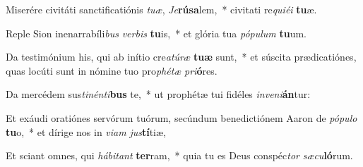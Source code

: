 \item Miserére civitáti sanctificatiónis \textit{tu}\textit{æ}, \textit{Je}\textbf{rú}\textbf{sa}lem,~* civitati re\textit{qui}\textit{é}\textit{i} \textbf{tu}æ.
\item Reple Sion inenarrabíli\textit{bus} \textit{ver}\textit{bis} \textbf{tu}is,~* et glória tua \textit{pó}\textit{pu}\textit{lum} \textbf{tu}um.
\item Da testimónium his, qui ab inítio cre\textit{a}\textit{tú}\textit{ræ} \textbf{tu}\textbf{æ} sunt,~* et súscita prædicatiónes, quas locúti sunt in nómine tuo pro\textit{phé}\textit{tæ} \textit{pri}\textbf{ó}res.
\item Da mercédem sus\textit{ti}\textit{nén}\textit{ti}\textbf{bus} te,~* ut prophétæ tui fidéles \textit{in}\textit{ve}\textit{ni}\textbf{án}tur:
\item Et exáudi oratiónes servórum tuórum, secúndum benedictiónem Aaron de \textit{pó}\textit{pu}\textit{lo} \textbf{tu}o,~* et dírige nos in \textit{vi}\textit{am} \textit{jus}\textbf{tí}tiæ,
\item Et sciant omnes, qui \textit{há}\textit{bi}\textit{tant} \textbf{ter}ram,~* quia tu es Deus conspéc\textit{tor} \textit{sæ}\textit{cu}\textbf{ló}rum.
